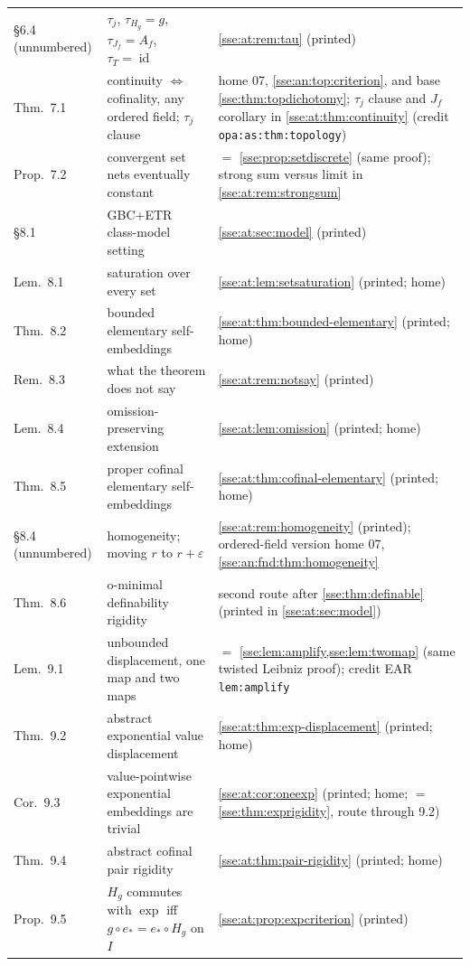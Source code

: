 \documentclass[11pt,a4paper]{article}
\numberwithin{equation}{section}
\theoremstyle{plain}
\theoremstyle{definition}
\theoremstyle{remark}
\newcommand{\id}{\operatorname{id}}
\newcommand{\lbl}[1]{\nolinkurl{#1}}%
\begin{document}
{\begin{longtable}{P{30mm}P{50mm}P{70mm}}
\S6.4 (unnumbered) & $\tau_j$, $\tau_{H_g}=g$, $\tau_{J_f}=A_f$, $\tau_T=\id$ & \cref{sse:at:rem:tau} (printed) \\
Thm.~7.1 & continuity $\Leftrightarrow$ cofinality, any ordered field; $\tau_j$ clause & home 07, \cref{sse:an:top:criterion}, and base \cref{sse:thm:topdichotomy}; $\tau_j$ clause and $J_f$ corollary in \cref{sse:at:thm:continuity} (credit \lbl{opa:as:thm:topology}) \\
Prop.~7.2 & convergent set nets eventually constant & $=$ \cref{sse:prop:setdiscrete} (same proof); strong sum versus limit in \cref{sse:at:rem:strongsum} \\
\S8.1 & GBC+ETR class-model setting & \cref{sse:at:sec:model} (printed) \\
Lem.~8.1 & saturation over every set & \cref{sse:at:lem:setsaturation} (printed; home) \\
Thm.~8.2 & bounded elementary self-embeddings & \cref{sse:at:thm:bounded-elementary} (printed; home) \\
Rem.~8.3 & what the theorem does not say & \cref{sse:at:rem:notsay} (printed) \\
Lem.~8.4 & omission-preserving extension & \cref{sse:at:lem:omission} (printed; home) \\
Thm.~8.5 & proper cofinal elementary self-embeddings & \cref{sse:at:thm:cofinal-elementary} (printed; home) \\
\S8.4 (unnumbered) & homogeneity; moving $r$ to $r+\varepsilon$ & \cref{sse:at:rem:homogeneity} (printed); ordered-field version home 07, \cref{sse:an:fnd:thm:homogeneity} \\
Thm.~8.6 & o-minimal definability rigidity & second route after \cref{sse:thm:definable} (printed in \cref{sse:at:sec:model}) \\
Lem.~9.1 & unbounded displacement, one map and two maps & $=$ \cref{sse:lem:amplify,sse:lem:twomap} (same twisted Leibniz proof); credit EAR \lbl{lem:amplify} \\
Thm.~9.2 & abstract exponential value displacement & \cref{sse:at:thm:exp-displacement} (printed; home) \\
Cor.~9.3 & value-pointwise exponential embeddings are trivial & \cref{sse:at:cor:oneexp} (printed; home; $=$ \cref{sse:thm:exprigidity}, route through 9.2) \\
Thm.~9.4 & abstract cofinal pair rigidity & \cref{sse:at:thm:pair-rigidity} (printed; home) \\
Prop.~9.5 & $H_g$ commutes with $\exp$ iff $g\circ e_*=e_*\circ H_g$ on $I$ & \cref{sse:at:prop:expcriterion} (printed) \\

\end{longtable}}
\end{document}

